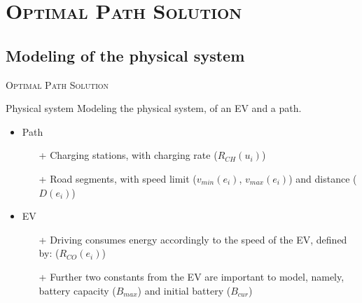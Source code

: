 \section{\scshape Optimal Path Solution}
\subsection{Modeling of the physical system}

\begin{frame}
\center \huge \scshape Optimal Path Solution
\end{frame}

\begin{frame}{Physical system}
Modeling the physical system, of an EV and a path.
\begin{figure}[!htb]
\centering
\end{figure} 
\begin{itemize}
\item Path
\begin{itemize}
\item[+] Charging stations, with charging rate ($R_{CH}(u_i)$)
\item[+] Road segments, with speed limit ($v_{min}(e_i)$, $v_{max}(e_i)$) and distance ($D(e_i)$) 
\end{itemize}
\item EV
\begin{itemize}
\item[+] Driving consumes energy accordingly to the speed of the EV, defined by: ($R_{CO}(e_i)$)
\item[+] Further two constants from the EV are important to model, namely, battery capacity ($B_{max}$) and initial battery ($B_{cur}$)
\end{itemize}
\end{itemize} 
\end{frame}
